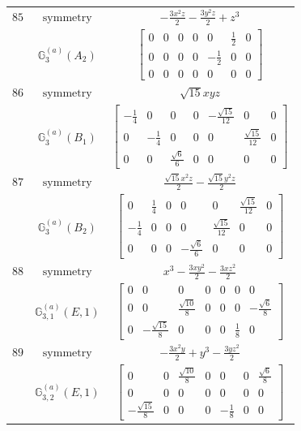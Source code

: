 \documentclass[fleqn,8pt,landscape]{jsarticle}
\begin{document}
\begin{longtable}{ccc}
$ 85 $ & $ \text{symmetry} $ & $ - \frac{3 x^{2} z}{2} - \frac{3 y^{2} z}{2} + z^{3} $ \\
$  $ & $ \mathbb{G}_{3}^{(a)}(A_{2}) $ & $ \begin{bmatrix} 0 & 0 & 0 & 0 & 0 & \frac{1}{2} & 0 \\ 0 & 0 & 0 & 0 & - \frac{1}{2} & 0 & 0 \\ 0 & 0 & 0 & 0 & 0 & 0 & 0 \end{bmatrix} $ \\ \hline
$ 86 $ & $ \text{symmetry} $ & $ \sqrt{15} x y z $ \\
$  $ & $ \mathbb{G}_{3}^{(a)}(B_{1}) $ & $ \begin{bmatrix} - \frac{1}{4} & 0 & 0 & 0 & - \frac{\sqrt{15}}{12} & 0 & 0 \\ 0 & - \frac{1}{4} & 0 & 0 & 0 & \frac{\sqrt{15}}{12} & 0 \\ 0 & 0 & \frac{\sqrt{6}}{6} & 0 & 0 & 0 & 0 \end{bmatrix} $ \\ \hline
$ 87 $ & $ \text{symmetry} $ & $ \frac{\sqrt{15} x^{2} z}{2} - \frac{\sqrt{15} y^{2} z}{2} $ \\
$  $ & $ \mathbb{G}_{3}^{(a)}(B_{2}) $ & $ \begin{bmatrix} 0 & \frac{1}{4} & 0 & 0 & 0 & \frac{\sqrt{15}}{12} & 0 \\ - \frac{1}{4} & 0 & 0 & 0 & \frac{\sqrt{15}}{12} & 0 & 0 \\ 0 & 0 & 0 & - \frac{\sqrt{6}}{6} & 0 & 0 & 0 \end{bmatrix} $ \\ \hline
$ 88 $ & $ \text{symmetry} $ & $ x^{3} - \frac{3 x y^{2}}{2} - \frac{3 x z^{2}}{2} $ \\
$  $ & $ \mathbb{G}_{3,1}^{(a)}(E,1) $ & $ \begin{bmatrix} 0 & 0 & 0 & 0 & 0 & 0 & 0 \\ 0 & 0 & \frac{\sqrt{10}}{8} & 0 & 0 & 0 & - \frac{\sqrt{6}}{8} \\ 0 & - \frac{\sqrt{15}}{8} & 0 & 0 & 0 & \frac{1}{8} & 0 \end{bmatrix} $ \\ \hline
$ 89 $ & $ \text{symmetry} $ & $ - \frac{3 x^{2} y}{2} + y^{3} - \frac{3 y z^{2}}{2} $ \\
$  $ & $ \mathbb{G}_{3,2}^{(a)}(E,1) $ & $ \begin{bmatrix} 0 & 0 & \frac{\sqrt{10}}{8} & 0 & 0 & 0 & \frac{\sqrt{6}}{8} \\ 0 & 0 & 0 & 0 & 0 & 0 & 0 \\ - \frac{\sqrt{15}}{8} & 0 & 0 & 0 & - \frac{1}{8} & 0 & 0 \end{bmatrix} $ \\ \hline

\end{longtable}
\end{document}

